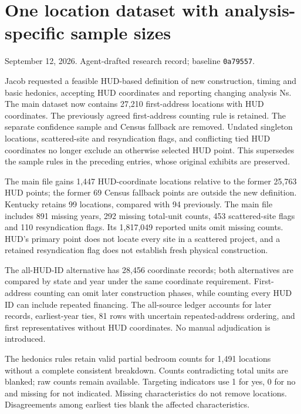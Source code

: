 \documentclass[11pt]{article}
\begin{document}
\section*{One location dataset with analysis-specific sample sizes}
\noindent September 12, 2026. Agent-drafted research record; baseline
\texttt{0a79557}.

Jacob requested a feasible HUD-based definition of new construction, timing and
basic hedonics, accepting HUD coordinates and reporting changing analysis Ns.
The main dataset now contains 27,210 first-address locations with HUD coordinates.
The previously agreed first-address counting rule is retained. The separate
confidence sample and Census fallback are removed. Undated singleton locations,
scattered-site and resyndication flags, and conflicting tied HUD coordinates no
longer exclude an otherwise selected HUD point. This supersedes the sample rules
in the preceding entries, whose original exhibits are preserved.

\begin{center}\small

\end{center}

The main file gains 1,447 HUD-coordinate locations relative to the former 25,763
HUD points; the former 69 Census fallback points are outside the new definition.
Kentucky retains 99 locations, compared with 94 previously. The main file includes
891 missing years, 292 missing total-unit counts, 453 scattered-site flags and
110 resyndication flags. Its 1,817,049 reported units omit missing counts. HUD's
primary point does not locate every site in a scattered project, and a retained
resyndication flag does not establish fresh physical construction.

The all-HUD-ID alternative has 28,456 coordinate records; both alternatives are
compared by state and year under the same coordinate requirement. First-address
counting can omit later construction phases, while counting every HUD ID can
include repeated financing. The all-source ledger accounts for later records,
earliest-year ties, 81 rows with uncertain repeated-address ordering, and first
representatives without HUD coordinates. No manual adjudication is introduced.

The hedonics rules retain valid partial bedroom counts for 1,491 locations without
a complete consistent breakdown. Counts contradicting total units are blanked;
raw counts remain available. Targeting indicators use 1 for yes, 0 for no and
missing for not indicated. Missing characteristics do not remove locations.
Disagreements among earliest ties blank the affected characteristics.
\end{document}

